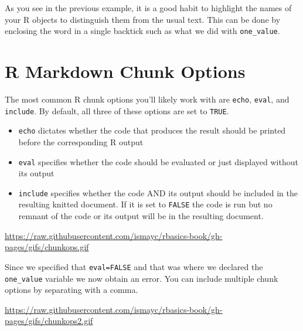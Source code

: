 \documentclass[]{tufte-book}
\theoremstyle{definition}
\theoremstyle{definition}
\theoremstyle{remark}
\begin{document}
As you see in the previous example, it is a good habit to highlight the
names of your R objects to distinguish them from the usual text. This
can be done by enclosing the word in a single backtick such as what we
did with \texttt{one\_value}.

\section{R Markdown Chunk Options}\label{r-markdown-chunk-options}

The most common R chunk options you'll likely work with are
\texttt{echo}, \texttt{eval}, and \texttt{include}. By default, all
three of these options are set to \texttt{TRUE}.

\begin{itemize}
\item
  \texttt{echo} dictates whether the code that produces the result
  should be printed before the corresponding R output
\item
  \texttt{eval} specifies whether the code should be evaluated or just
  displayed without its output
\item
  \texttt{include} specifies whether the code AND its output should be
  included in the resulting knitted document. If it is set to
  \texttt{FALSE} the code is run but no remnant of the code or its
  output will be in the resulting document.
\end{itemize}

\vspace{0.1in}

\begin{center}\footnotesize{\url{https://raw.githubusercontent.com/ismayc/rbasics-book/gh-pages/gifs/chunkops.gif}}\end{center}

\vspace{0.1in}

Since we specified that \texttt{eval=FALSE} and that was where we
declared the \texttt{one\_value} variable we now obtain an error. You
can include multiple chunk options by separating with a comma.

\vspace{0.1in}

\begin{center}\footnotesize{\url{https://raw.githubusercontent.com/ismayc/rbasics-book/gh-pages/gifs/chunkops2.gif}}\end{center}

\vspace{0.1in}
\end{document}
